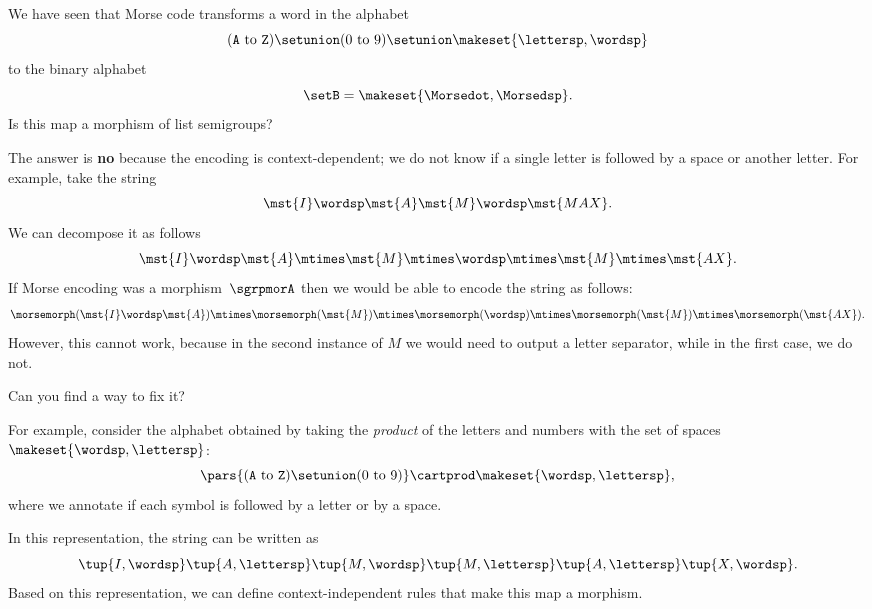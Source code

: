 \begin{exercise}
    We have seen that Morse code transforms a word in the alphabet
    \begin{equation}
        (\texttt{A} \ \text{to}\ \texttt{Z})
        \setunion (0 \ \text{to}\ 9) \setunion \makeset{\lettersp, \wordsp}
    \end{equation}
    to the binary alphabet
    \begin{equation}
        \setB = \makeset{\Morsedot, \Morsedsp}.
    \end{equation}
    Is this map a morphism of list semigroups?
\end{exercise}
%
\begin{solution}
    The answer is \textbf{no} because the encoding is context-dependent; we do not know if a single letter is followed by a space or another letter.
    For example, take the string
    \begin{equation}
        \label{eq:max-iammax}
        \mst {I} \wordsp \mst{A} \mst{M}\wordsp \mst{MAX}.
    \end{equation}
    We can decompose it as follows
    \begin{equation}
        \label{eq:max-iammax-decomp}
        \mst{I}\wordsp \mst{A}\mtimes \mst{M} \mtimes \wordsp \mtimes \mst{M} \mtimes \mst{AX}.
    \end{equation}
    If Morse encoding was a morphism~$\sgrpmorA$ then we would be able to encode the string as follows:
    \begin{equation}
        \label{eq:max-iammax-decomp-morph}
        \morsemorph(\mst{I}\wordsp \mst{A}) \mtimes \morsemorph (\mst{M}) \mtimes \morsemorph(\wordsp) \mtimes \morsemorph(\mst{M})
        \mtimes \morsemorph(\mst{AX}).
    \end{equation}
    However, this cannot work, because in the second instance of $M$ we would need to output a letter separator, while in the first case, we do not.

    Can you find a way to fix it?

    For example, consider the alphabet obtained by taking the \emph{product} of the letters and numbers with the set of spaces~$\makeset{\wordsp, \lettersp}$:
    \begin{equation}
        \pars{ (\texttt{A} \ \text{to}\ \texttt{Z}) \setunion (0 \ \text{to}\ 9) } \cartprod \makeset{\wordsp, \lettersp},
    \end{equation}
    where we annotate if each symbol is followed by a letter or by a space.

    In this representation, the string can be written as
    \begin{equation}
        \tup{I, \wordsp} \tup{A, \lettersp} \tup{M, \wordsp} \tup{M, \lettersp} \tup{A, \lettersp}
        \tup{X, \wordsp}.
    \end{equation}
    Based on this representation, we can define context-independent rules that make this map a morphism.
\end{solution}

